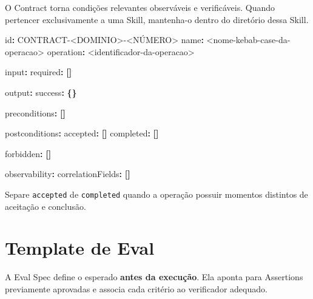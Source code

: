 \documentclass[
  10pt,
  a4paper,
  oneside]{book}
\newenvironment{Shaded}{}{}
\newcommand{\AttributeTok}[1]{\textcolor[rgb]{0.49,0.56,0.16}{#1}}
\newcommand{\FunctionTok}[1]{\textcolor[rgb]{0.02,0.16,0.49}{#1}}
\newcommand{\KeywordTok}[1]{\textcolor[rgb]{0.00,0.44,0.13}{\textbf{#1}}}
\renewenvironment{Shaded}{\begin{snugshade}}{\end{snugshade}}%
\begin{document}
O Contract torna condições relevantes observáveis e verificáveis. Quando
pertencer exclusivamente a uma Skill, mantenha-o dentro do diretório
dessa Skill.

\begin{Shaded}
\begin{Highlighting}[]
\FunctionTok{id}\KeywordTok{:}\AttributeTok{ CONTRACT{-}\textless{}DOMINIO\textgreater{}{-}\textless{}NÚMERO\textgreater{}}
\FunctionTok{name}\KeywordTok{:}\AttributeTok{ \textless{}nome{-}kebab{-}case{-}da{-}operacao\textgreater{}}
\FunctionTok{operation}\KeywordTok{:}\AttributeTok{ \textless{}identificador{-}da{-}operacao\textgreater{}}

\FunctionTok{input}\KeywordTok{:}
\AttributeTok{  }\FunctionTok{required}\KeywordTok{:}\AttributeTok{ }\KeywordTok{[]}

\FunctionTok{output}\KeywordTok{:}
\AttributeTok{  }\FunctionTok{success}\KeywordTok{:}\AttributeTok{ }\KeywordTok{\{\}}

\FunctionTok{preconditions}\KeywordTok{:}\AttributeTok{ }\KeywordTok{[]}

\FunctionTok{postconditions}\KeywordTok{:}
\AttributeTok{  }\FunctionTok{accepted}\KeywordTok{:}\AttributeTok{ }\KeywordTok{[]}
\AttributeTok{  }\FunctionTok{completed}\KeywordTok{:}\AttributeTok{ }\KeywordTok{[]}

\FunctionTok{forbidden}\KeywordTok{:}\AttributeTok{ }\KeywordTok{[]}

\FunctionTok{observability}\KeywordTok{:}
\AttributeTok{  }\FunctionTok{correlationFields}\KeywordTok{:}\AttributeTok{ }\KeywordTok{[]}
\end{Highlighting}
\end{Shaded}

Separe \texttt{accepted} de \texttt{completed} quando a operação possuir
momentos distintos de aceitação e conclusão.

\hypertarget{template-de-eval}{%
\section{Template de Eval}\label{template-de-eval}}

A Eval Spec define o esperado \textbf{antes da execução}. Ela aponta
para Assertions previamente aprovadas e associa cada critério ao
verificador adequado.
\end{document}
